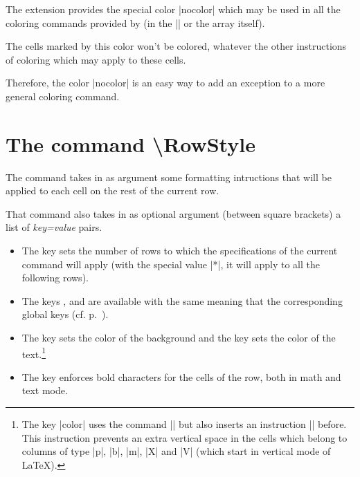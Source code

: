 \documentclass[dvipsnames]{article}%
\begin{document}

The extension  provides the special color |nocolor| which may be
used in all the coloring commands provided by  (in the
|\CodeBefore| or the array itself).

The cells marked by this color won't be colored, whatever the other instructions
of coloring which may apply to these cells.

Therefore, the color |nocolor| is an easy way to add an exception to a more
general coloring command.

\section{The command \textbackslash RowStyle}

\label{RowStyle}


The command  takes in as argument some formatting
intructions that will be applied to each cell on the rest of the current row.

\medskip
That command also takes in as optional argument (between square brackets)
a list of \textsl{key=value} pairs. 
\begin{itemize}
\item {} The key  sets
the number of rows to which the specifications of the current command will
apply (with the special value |*|, it will apply to all the following rows).
\item The keys ,  and
 are available with the same meaning that the
corresponding global keys (cf. p.~\pageref{cell-space}).
\item {}
The key  sets the color of the background and the key
 sets the color of the text.\footnote{The key |color| uses the command
|\color| but also inserts an instruction |\leavevmode| before. This
instruction prevents an extra vertical space in the cells which belong to
columns of type |p|, |b|, |m|, |X| and |V| (which start in
vertical mode of LaTeX).}
\item {} The key
 enforces bold characters for the cells of the row, both in
math and text mode. 
\end{itemize}
\end{document}
